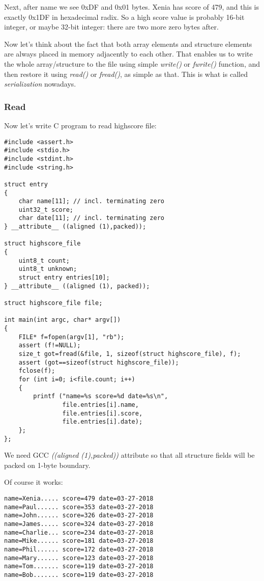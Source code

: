 Next, after  name we see 0xDF and 0x01 bytes.
Xenia has score of 479, and this is exactly 0x1DF in hexadecimal radix.
So a high score value is probably 16-bit integer, or maybe 32-bit integer: there are two more zero bytes after.

Now let's think about the fact that both array elements and structure elements are always placed in memory adjacently to each other.
That enables us to write the whole array/structure to the file using simple \emph{write()} or \emph{fwrite()} function, 
and then restore it using \emph{read()} or \emph{fread()}, as simple as that.
This is what is called \emph{serialization} nowadays.

\subsubsection{Read}

Now let's write C program to read highscore file:

\begin{lstlisting}[style=customc]
#include <assert.h>
#include <stdio.h>
#include <stdint.h>
#include <string.h>

struct entry
{
	char name[11]; // incl. terminating zero
	uint32_t score;
	char date[11]; // incl. terminating zero
} __attribute__ ((aligned (1),packed));

struct highscore_file
{
	uint8_t count;
	uint8_t unknown;
	struct entry entries[10];
} __attribute__ ((aligned (1), packed));

struct highscore_file file;

int main(int argc, char* argv[])
{
	FILE* f=fopen(argv[1], "rb");
	assert (f!=NULL);
	size_t got=fread(&file, 1, sizeof(struct highscore_file), f);
	assert (got==sizeof(struct highscore_file));
	fclose(f);
	for (int i=0; i<file.count; i++)
	{
		printf ("name=%s score=%d date=%s\n",
				file.entries[i].name,
				file.entries[i].score,
				file.entries[i].date);
	};
};
\end{lstlisting}

We need GCC \emph{((aligned (1),packed))} attribute so that all structure fields will be packed on 1-byte boundary.

Of course it works:

\begin{lstlisting}
name=Xenia..... score=479 date=03-27-2018
name=Paul...... score=353 date=03-27-2018
name=John...... score=326 date=03-27-2018
name=James..... score=324 date=03-27-2018
name=Charlie... score=234 date=03-27-2018
name=Mike...... score=181 date=03-27-2018
name=Phil...... score=172 date=03-27-2018
name=Mary...... score=123 date=03-27-2018
name=Tom....... score=119 date=03-27-2018
name=Bob....... score=119 date=03-27-2018
\end{lstlisting}

